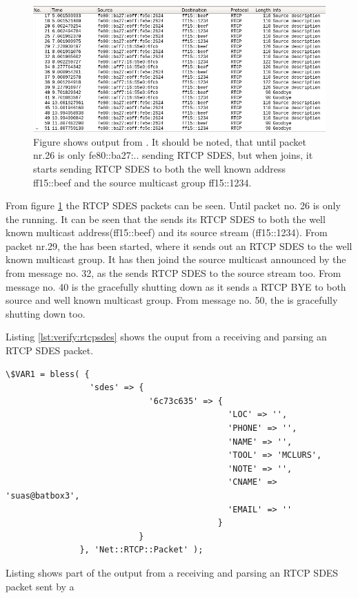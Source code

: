\begin{figure}[H]
	\centering
	\includegraphics[width=\textwidth]{figures/wireshark_presence}
	\caption{Figure shows output from . It should be noted, that until packet nr.26 is only fe80::ba27:.. sending RTCP SDES, but when \sub{} joins, it starts sending RTCP SDES to both the well known address ff15::beef and the source multicast group ff15::1234.} \label{fig:verify:wireshark_presence}
\end{figure}
From figure \ref{fig:verify:wireshark_presence} the RTCP SDES packets can be seen. Until packet no. 26 is only the \pub{} running. It can be seen that the \pub{} sends its RTCP SDES to both the well known multicast address(ff15::beef) and its source stream (ff15::1234). From packet nr.29, the \sub{} has been started, where it sends out an RTCP SDES to the well known multicast group. It has then joind the source multicast announced by the \pub{} from message no. 32, as the \sub{} sends RTCP SDES to the source stream too. From message no. 40 is the \sub{} gracefully shutting down as it sends a RTCP BYE to both source and well known multicast group. From message no. 50, the \pub{} is gracefully shutting down too.

Listing \ref{lst:verify:rtcpsdes} shows the ouput from a \sub{} receiving and parsing an RTCP SDES packet.

\begin{listing}[h] 
\begin{verbatim}
\$VAR1 = bless( {
                 'sdes' => {
                             '6c73c635' => {
                                             'LOC' => '',
                                             'PHONE' => '',
                                             'NAME' => '',
                                             'TOOL' => 'MCLURS',
                                             'NOTE' => '',
                                             'CNAME' => 'suas@batbox3',
                                             'EMAIL' => ''
                                           }
                           }
               }, 'Net::RTCP::Packet' );
\end{verbatim}
\caption{Listing shows part of the output from a \sub{} receiving and parsing an RTCP SDES packet sent by a \pub{}}
\label{lst:verify:rtcpsdes}
\end{listing}


